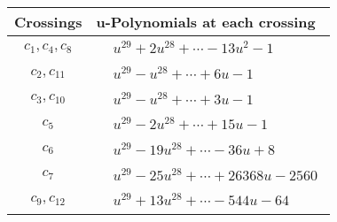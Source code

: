 \documentclass[1p]{elsarticle_modified}
\theoremstyle{definition}
\begin{document}
\begin{tabular}{m{50pt}|m{274pt}}
Crossings & \hspace{64pt}u-Polynomials at each crossing \\
\hline $$\begin{aligned}c_{1},c_{4},c_{8}\end{aligned}$$&$\begin{aligned}
&u^{29}+2 u^{28}+\cdots-13 u^2-1
\end{aligned}$\\
\hline $$\begin{aligned}c_{2},c_{11}\end{aligned}$$&$\begin{aligned}
&u^{29}- u^{28}+\cdots+6 u-1
\end{aligned}$\\
\hline $$\begin{aligned}c_{3},c_{10}\end{aligned}$$&$\begin{aligned}
&u^{29}- u^{28}+\cdots+3 u-1
\end{aligned}$\\
\hline $$\begin{aligned}c_{5}\end{aligned}$$&$\begin{aligned}
&u^{29}-2 u^{28}+\cdots+15 u-1
\end{aligned}$\\
\hline $$\begin{aligned}c_{6}\end{aligned}$$&$\begin{aligned}
&u^{29}-19 u^{28}+\cdots-36 u+8
\end{aligned}$\\
\hline $$\begin{aligned}c_{7}\end{aligned}$$&$\begin{aligned}
&u^{29}-25 u^{28}+\cdots+26368 u-2560
\end{aligned}$\\
\hline $$\begin{aligned}c_{9},c_{12}\end{aligned}$$&$\begin{aligned}
&u^{29}+13 u^{28}+\cdots-544 u-64
\end{aligned}$\\
\hline
\end{tabular}\\~\\
\newpage\renewcommand{\arraystretch}{1}
\end{document}
